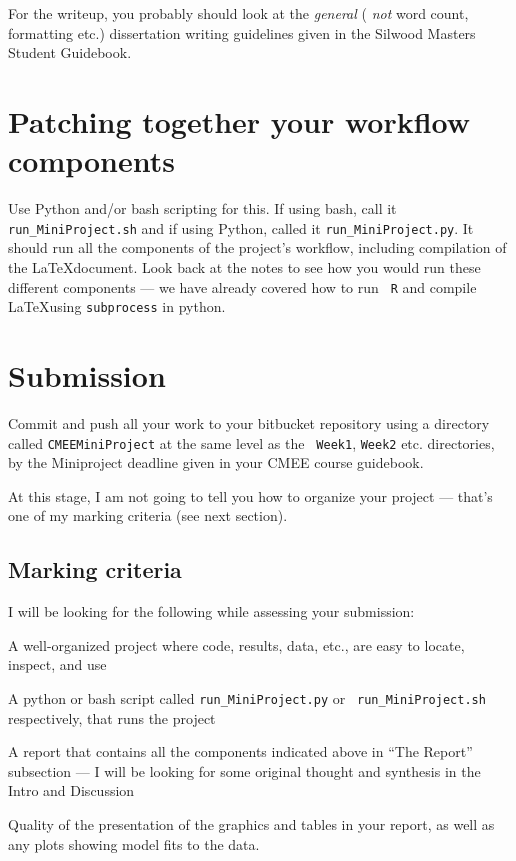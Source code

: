 For the writeup, you probably should look at the {\it general} ( {\it 
not} word count, formatting etc.) dissertation writing guidelines given 
in the Silwood Masters Student Guidebook.  

\section{Patching together your workflow components}

Use Python and/or bash scripting for this. If using bash, call it  {\tt run\_MiniProject.sh} and if using Python, called it {\tt run\_MiniProject.py}. It should run all the 
components of the project's workflow, including compilation of 
the \LaTeX document. Look back at the notes to see how you would run 
these different components --- we have already covered how to run {\tt 
R} and compile \LaTeX using {\tt subprocess} in python.

\section{Submission}

Commit and push all your work to your bitbucket repository using a 
directory called {\tt CMEEMiniProject} at the same level as the {\tt 
Week1}, {\tt Week2} etc. directories, by the Miniproject deadline given 
in your CMEE course guidebook.

At this stage, I am not going to tell you how to organize your project 
--- that's one of my marking criteria (see next section). 

\subsection {Marking criteria}

I will be looking for the following while assessing your submission:

\begin{compactitem}

	\item A well-organized project where code, results, data, etc., are 
	easy to locate, inspect, and use 

	\item A python or bash script called {\tt run\_MiniProject.py} or {\tt 
	run\_MiniProject.sh} respectively, that runs the project

	\item A report that contains all the components indicated above in 
	``The Report'' subsection --- I will be looking for some 
	original thought and synthesis in the Intro and Discussion

	\item Quality of the presentation of the graphics and tables in your 
	report, as well as any plots showing model fits to the data.  

\end{compactitem}

